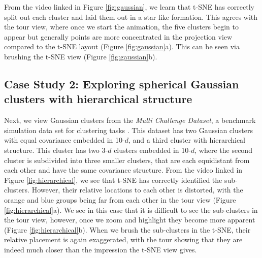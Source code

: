 \documentclass[article,notitle]{jdssv}
\begin{document}
From the video linked in Figure \ref{fig:gaussian}, we learn that t-SNE has
correctly split out each cluster and laid them out in a star like formation.
This agrees with the tour view,
where once we start the animation, the five clusters begin to appear but
generally points are more concentrated in the projection view compared to
the t-SNE layout (Figure \ref{fig:gaussian}a).
This can be seen via brushing the t-SNE view (Figure \ref{fig:gaussian}b).

\hypertarget{case-study-2-exploring-spherical-gaussian-clusters-with-hierarchical-structure}{%
\subsection{Case Study 2: Exploring spherical Gaussian clusters with hierarchical structure}\label{case-study-2-exploring-spherical-gaussian-clusters-with-hierarchical-structure}}

Next, we view Gaussian clusters from the
\emph{Multi Challenge Dataset}, a benchmark simulation data set for clustering tasks
\citep{Rauber2009-vh}. This dataset has two Gaussian clusters with equal covariance
embedded in 10-\(d\), and a third cluster
with hierarchical structure. This cluster has two 3-\(d\) clusters embedded in
10-\(d\), where the second cluster is subdivided into three smaller clusters,
that are each equidistant from each other and have the same covariance structure.
From the video linked in Figure \ref{fig:hierarchical}, we see
that t-SNE has correctly identified the sub-clusters. However, their relative
locations to each other is distorted, with the orange and blue groups being
far from each other in the tour view (Figure \ref{fig:hierarchical}a). We see
in this case that it is difficult
to see the sub-clusters in the tour view, however, once we zoom and highlight
they become more apparent (Figure \ref{fig:hierarchical}b). When we brush
the sub-clusters in the t-SNE, their
relative placement is again exaggerated, with the tour showing that they
are indeed much closer than the impression the t-SNE view gives.
\end{document}
